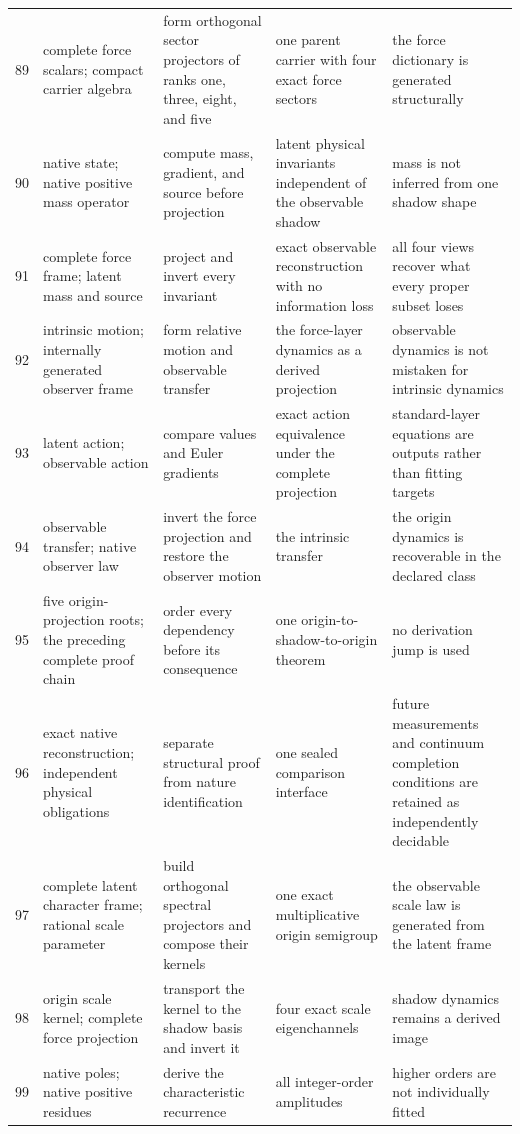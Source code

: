 \documentclass[11pt]{article}
\numberwithin{equation}{section}
\theoremstyle{remark}
\begin{document}
\begin{landscape}
\begin{longtable}{p{0.65cm}p{3.5cm}p{4.0cm}p{4.0cm}p{4.6cm}}
89&complete force scalars; compact carrier algebra&form orthogonal sector projectors of ranks one, three, eight, and five&one parent carrier with four exact force sectors&the force dictionary is generated structurally\\
90&native state; native positive mass operator&compute mass, gradient, and source before projection&latent physical invariants independent of the observable shadow&mass is not inferred from one shadow shape\\
91&complete force frame; latent mass and source&project and invert every invariant&exact observable reconstruction with no information loss&all four views recover what every proper subset loses\\
92&intrinsic motion; internally generated observer frame&form relative motion and observable transfer&the force-layer dynamics as a derived projection&observable dynamics is not mistaken for intrinsic dynamics\\
93&latent action; observable action&compare values and Euler gradients&exact action equivalence under the complete projection&standard-layer equations are outputs rather than fitting targets\\
94&observable transfer; native observer law&invert the force projection and restore the observer motion&the intrinsic transfer&the origin dynamics is recoverable in the declared class\\
95&five origin-projection roots; the preceding complete proof chain&order every dependency before its consequence&one origin-to-shadow-to-origin theorem&no derivation jump is used\\
96&exact native reconstruction; independent physical obligations&separate structural proof from nature identification&one sealed comparison interface&future measurements and continuum completion conditions are retained as independently decidable\\
97&complete latent character frame; rational scale parameter&build orthogonal spectral projectors and compose their kernels&one exact multiplicative origin semigroup&the observable scale law is generated from the latent frame\\
98&origin scale kernel; complete force projection&transport the kernel to the shadow basis and invert it&four exact scale eigenchannels&shadow dynamics remains a derived image\\
99&native poles; native positive residues&derive the characteristic recurrence&all integer-order amplitudes&higher orders are not individually fitted\\

\end{longtable}
\end{landscape}
\end{document}
